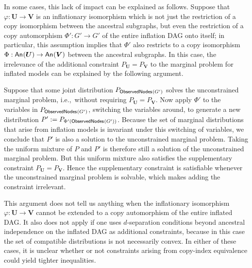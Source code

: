 \documentclass[aps,english,superscriptaddress,onecolumn,twoside,longbibliography,pra,floatfix,fleqn,nofootinbib]{revtex4-1}%
\newcommand*{\tblue}[1]{{\color{MidnightBlue}{\textbf{#1}}}}
\theoremstyle{definition}
\newcommand{\An}[2][]{{\mathsf{An}_{#1}}\parenths{#2}}
\newcommand{\SmallNamedFunction}[3][]{\operatorname{\mathsf{#2}}_{#1}\parenths{#3}}
\newcommand{\nodes}[1]{\SmallNamedFunction{Nodes}{#1}}
\DeclarePairedDelimiter{\parenths}{\lparen}{\rparen}
\begin{document}
In some cases, this lack of impact can be explained as follows.
Suppose that $\varphi:\bm{U}\to\bm{V}$ is an inflationary isomorphism 
which is not just the restriction of a copy isomorphism between the ancestral subgraphs, but even the restriction of a copy automorphism 
$\Phi':G'\to G'$ of the entire inflation DAG onto itself; in particular, this assumption implies that $\Phi'$ also restricts to a copy isomorphism $\Phi:\An{\bm{U}}\to\An{\bm{V}}$ between the ancestral subgraphs. In this case, the irrelevance of the additional constraint $P_{\bm{U}} = P_{\bm{V}}$ to the marginal problem for inflated models can be explained by the following argument. 

Suppose that some joint distribution $P_{\SmallNamedFunction{ObservedNodes}{G'}}$ solves the unconstrained marginal problem, i.e.,~without requiring $P_{\bm{U}} = P_{\bm{V}}$. Now apply $\Phi'$ to the variables in $P_{\SmallNamedFunction{ObservedNodes}{G'}}$, switching the variables around, to generate a new distribution $P':=P_{\Phi'(\SmallNamedFunction{ObservedNodes}{G'})}$. Because the set of marginal distributions that arise from inflation models is invariant under this switching of variables, we conclude that $P'$ is also a solution to the unconstrained marginal problem. Taking the uniform mixture of $P$ and $P'$ is therefore still a solution of the unconstrained marginal problem. But this uniform mixture also satisfies the supplementary constraint $P_{\bm{U}} = P_{\bm{V}}$. Hence the supplementary constraint is satisfiable whenever the unconstrained marginal problem is solvable, which makes adding the constraint irrelevant.

This argument does not tell us anything when the inflationary isomorphism $\varphi:\bm{U}\to\bm{V}$ cannot be extended to a copy automorphism of the entire inflated DAG. It also does not apply if one uses $d$-separation conditions beyond ancestral independence  on the inflated DAG as additional constraints, because in this case the set of compatible distributions is not necessarily convex.  In either of these cases, it is unclear whether or not constraints arising from copy-index equivalence could yield tighter inequalities. 
\end{document}
